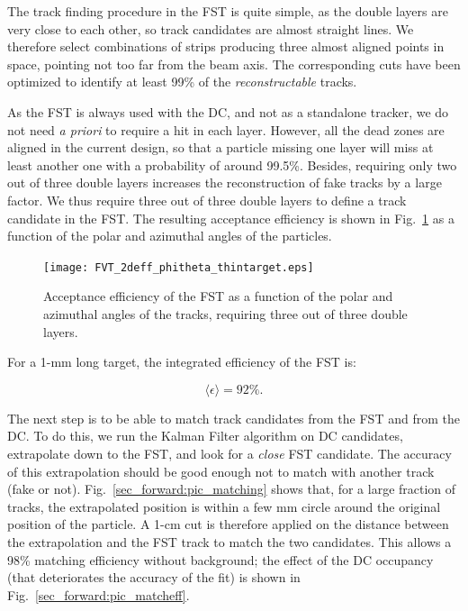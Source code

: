 The track finding procedure in the FST is quite simple, as the double layers are very 
close to each other, so track candidates are almost straight lines.  We therefore 
select combinations of strips producing three almost aligned points in space, 
pointing not too far from the beam axis.  The corresponding cuts have been optimized 
to identify at least 99\% of the \emph{reconstructable} tracks.

As the FST is always used with the DC, and not as a standalone tracker, we do not 
need \emph{a priori} to require a hit in each layer.  However, all the dead zones are 
aligned in the current design, so that a particle missing one layer will miss at least 
another one with a probability of around 99.5\%.  Besides, requiring only two out of 
three double layers increases the reconstruction of fake tracks by a large factor. 
We thus require three out of three double layers to define a track candidate in the 
FST.  The resulting acceptance efficiency is shown in Fig.~\ref{sec_forward:pic_FSTeff} 
as a function of the polar and azimuthal angles of the particles.

\begin{figure}[ht!]
\centering
\texttt{[image: FVT\_2deff\_phitheta\_thintarget.eps]}
\caption{\small{Acceptance efficiency of the FST as a function of the polar and 
azimuthal angles of the tracks, requiring three out of three double layers.}}
\label{sec_forward:pic_FSTeff}
\end{figure}

For a 1-mm long target, the integrated efficiency of the FST is:

\begin{equation}
\langle \epsilon \rangle = 92\%.
\end{equation}

\noindent
The next step is to be able to match track candidates from the FST and from the DC. 
To do this, we run the Kalman Filter algorithm on DC candidates, extrapolate down 
to the FST, and look for a \emph{close} FST candidate.  The accuracy of this 
extrapolation should be good enough not to match with another track (fake or not). 
Fig.~\ref{sec_forward:pic_matching} shows that, for a large fraction of tracks, the 
extrapolated position is within a few mm circle around the original position of the 
particle.  A 1-cm cut is therefore applied on the distance between the extrapolation 
and the FST track to match the two candidates.  This allows a 98\% matching efficiency 
without background; the effect of the DC occupancy (that deteriorates the accuracy of 
the fit) is shown in Fig.~\ref{sec_forward:pic_matcheff}.

